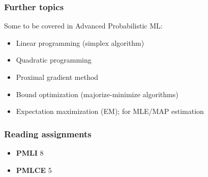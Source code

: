 \documentclass[smaller]{beamer}
\newcommand{\?}{\stackrel{?}{=}}
\newcommand{\fr}{\frac}
\newcommand{\pe}{\pause}
\begin{document}
    





\begin{frame}
  \frametitle{Further topics}
  Some to be covered in Advanced Probabilistic ML:\pe
  \begin{itemize}
  \item Linear programming (simplex algorithm)
  \item Quadratic programming 
  \item Proximal gradient method
  \item Bound optimization (majorize-minimize algorithms)
  \item Expectation maximization (EM); for MLE/MAP estimation
    
  \end{itemize}
\end{frame}
\begin{frame}
  \frametitle{Reading assignments}

  \begin{itemize}
  \item \textbf{PMLI} 8
  \item \textbf{PMLCE} 5
  \end{itemize}
\end{frame}




\end{document}

